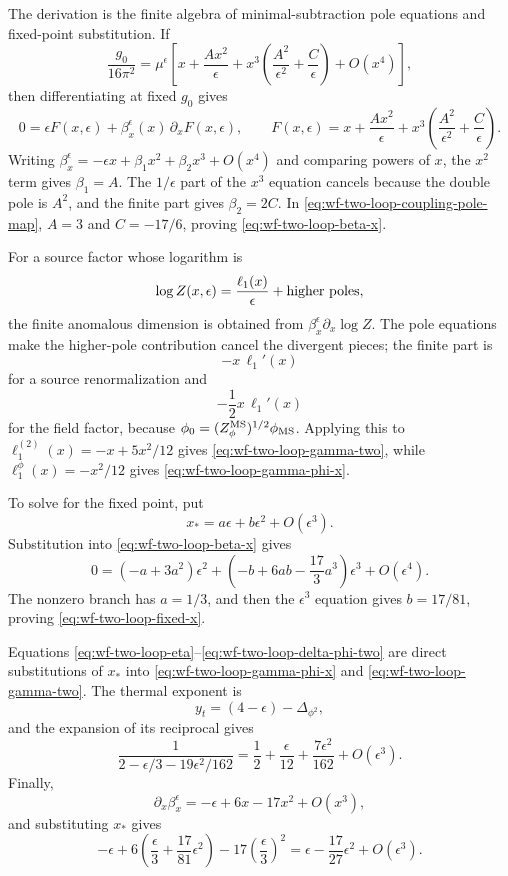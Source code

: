 The derivation is the finite algebra of minimal-subtraction pole equations and
fixed-point substitution.  If
\[
  \frac{g_0}{16\pi^2}
  =
  \mu^\epsilon
  \left[
    x+\frac{A x^2}{\epsilon}
    +x^3\left(\frac{A^2}{\epsilon^2}
      +\frac{C}{\epsilon}\right)
    +O(x^4)
  \right],
\]
then differentiating at fixed \(g_0\) gives
\[
  0
  =
  \epsilon F(x,\epsilon)+\beta_x^\epsilon(x)\,\partial_xF(x,\epsilon),
  \qquad
  F(x,\epsilon)
  =
  x+\frac{A x^2}{\epsilon}
  +x^3\left(\frac{A^2}{\epsilon^2}
    +\frac{C}{\epsilon}\right).
\]
Writing
\(\beta_x^\epsilon=-\epsilon x+\beta_1x^2+\beta_2x^3+O(x^4)\) and comparing
powers of \(x\), the \(x^2\) term gives \(\beta_1=A\).  The \(1/\epsilon\)
part of the \(x^3\) equation cancels because the double pole is \(A^2\), and
the finite part gives \(\beta_2=2C\).  In
\eqref{eq:wf-two-loop-coupling-pole-map}, \(A=3\) and \(C=-17/6\), proving
\eqref{eq:wf-two-loop-beta-x}.

For a source factor whose logarithm is
\[
  \log Z(x,\epsilon)=\frac{\ell_1(x)}{\epsilon}+\hbox{higher poles},
\]
the finite anomalous dimension is obtained from
\(\beta_x^\epsilon\partial_x\log Z\).  The pole equations make the higher-pole
contribution cancel the divergent pieces; the finite part is
\[
  -x\,\ell_1'(x)
\]
for a source renormalization and
\[
  -\frac12x\,\ell_1'(x)
\]
for the field factor, because
\(\phi_0=(Z_\phi^{\rm MS})^{1/2}\phi_{\rm MS}\).  Applying this to
\(\ell_1^{(2)}(x)=-x+5x^2/12\) gives
\eqref{eq:wf-two-loop-gamma-two}, while
\(\ell_1^\phi(x)=-x^2/12\) gives
\eqref{eq:wf-two-loop-gamma-phi-x}.

To solve for the fixed point, put
\[
  x_*=a\epsilon+b\epsilon^2+O(\epsilon^3).
\]
Substitution into
\eqref{eq:wf-two-loop-beta-x} gives
\[
  0=(-a+3a^2)\epsilon^2
   +\left(-b+6ab-\frac{17}{3}a^3\right)\epsilon^3
   +O(\epsilon^4).
\]
The nonzero branch has \(a=1/3\), and then the \(\epsilon^3\) equation gives
\(b=17/81\), proving \eqref{eq:wf-two-loop-fixed-x}.

Equations \eqref{eq:wf-two-loop-eta}--\eqref{eq:wf-two-loop-delta-phi-two}
are direct substitutions of \(x_*\) into
\eqref{eq:wf-two-loop-gamma-phi-x} and
\eqref{eq:wf-two-loop-gamma-two}.  The thermal exponent is
\[
  y_t=(4-\epsilon)-\Delta_{\phi^2},
\]
and the expansion of its reciprocal gives
\[
  \frac{1}{2-\epsilon/3-19\epsilon^2/162}
  =
  \frac12+\frac{\epsilon}{12}+\frac{7\epsilon^2}{162}
  +O(\epsilon^3).
\]
Finally,
\[
  \partial_x\beta_x^\epsilon
  =
  -\epsilon+6x-17x^2+O(x^3),
\]
and substituting \(x_*\) gives
\[
  -\epsilon+6\left(\frac{\epsilon}{3}
    +\frac{17}{81}\epsilon^2\right)
  -17\left(\frac{\epsilon}{3}\right)^2
  =
  \epsilon-\frac{17}{27}\epsilon^2+O(\epsilon^3).
\]

